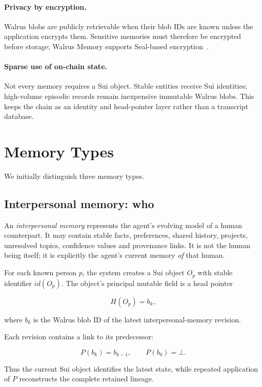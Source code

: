 \documentclass[11pt]{article}
\begin{document}
\paragraph{Privacy by encryption.}
Walrus blobs are publicly retrievable when their blob IDs are known unless the application encrypts them. Sensitive memories must therefore be encrypted before storage; Walrus Memory supports Seal-based encryption~\cite{walrus-agent-loop,walrus-console}.

\paragraph{Sparse use of on-chain state.}
Not every memory requires a Sui object. Stable entities receive Sui identities; high-volume episodic records remain inexpensive immutable Walrus blobs. This keeps the chain as an identity and head-pointer layer rather than a transcript database.

\section{Memory Types}

We initially distinguish three memory types.

\subsection{Interpersonal memory: who}

An \emph{interpersonal memory} represents the agent's evolving model of a human counterpart. It may contain stable facts, preferences, shared history, projects, unresolved topics, confidence values and provenance links. It is not the human being itself; it is explicitly the agent's current memory \emph{of} that human.

For each known person $p$, the system creates a Sui object $O_p$ with stable identifier $id(O_p)$. The object's principal mutable field is a head pointer

\[
H(O_p) = b_k,
\]

where $b_k$ is the Walrus blob ID of the latest interpersonal-memory revision.

Each revision contains a link to its predecessor:

\[
P(b_k)=b_{k-1}, \qquad P(b_0)=\bot.
\]

Thus the current Sui object identifies the latest state, while repeated application of $P$ reconstructs the complete retained lineage.
\end{document}
